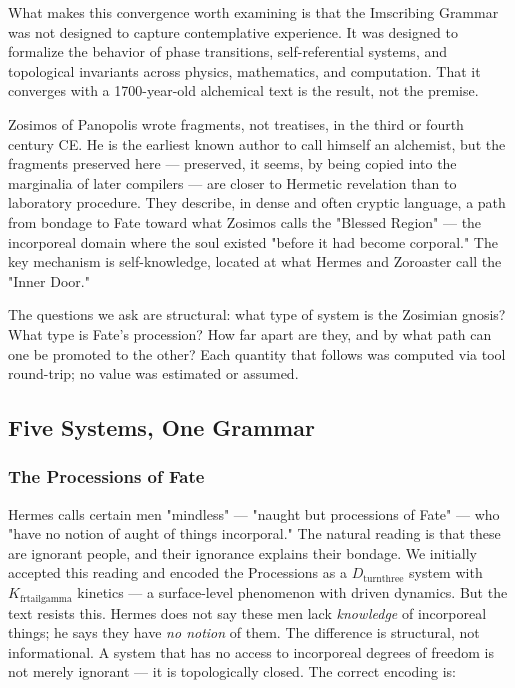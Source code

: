 \documentclass[12pt,a4paper]{article}
\begin{document}
What makes this convergence worth examining is that the Imscribing Grammar was not designed to capture contemplative experience. It was designed to formalize the behavior of phase transitions, self-referential systems, and topological invariants across physics, mathematics, and computation. That it converges with a 1700-year-old alchemical text is the result, not the premise.

Zosimos of Panopolis wrote fragments, not treatises, in the third or fourth century CE. He is the earliest known author to call himself an alchemist, but the fragments preserved here --- preserved, it seems, by being copied into the marginalia of later compilers --- are closer to Hermetic revelation than to laboratory procedure. They describe, in dense and often cryptic language, a path from bondage to Fate toward what Zosimos calls the "Blessed Region" --- the incorporeal domain where the soul existed "before it had become corporal." The key mechanism is self-knowledge, located at what Hermes and Zoroaster call the "Inner Door."

The questions we ask are structural: what type of system is the Zosimian gnosis? What type is Fate's procession? How far apart are they, and by what path can one be promoted to the other? Each quantity that follows was computed via tool round-trip; no value was estimated or assumed.

\subsection{Five Systems, One Grammar}

\subsubsection{The Processions of Fate}

Hermes calls certain men "mindless" --- "naught but processions of Fate" --- who "have no notion of aught of things incorporal." The natural reading is that these are ignorant people, and their ignorance explains their bondage. We initially accepted this reading and encoded the Processions as a $D_{\text{turnthree}}$ system with $K_{\text{frtailgamma}}$ kinetics --- a surface-level phenomenon with driven dynamics. But the text resists this. Hermes does not say these men lack \emph{knowledge} of incorporeal things; he says they have \emph{no notion} of them. The difference is structural, not informational. A system that has no access to incorporeal degrees of freedom is not merely ignorant --- it is topologically closed. The correct encoding is:
\end{document}
